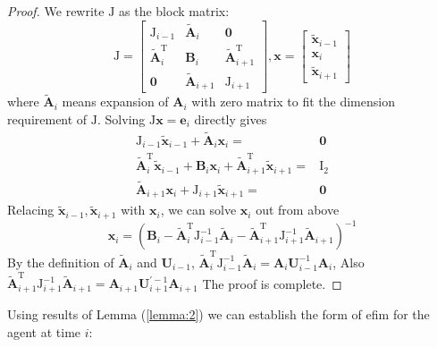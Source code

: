 \documentclass[conference]{IEEEtran}
\begin{document}
\begin{proof}
We rewrite $\bm{\mathrm{J}}$ as the block matrix:
\begin{equation}
\bm{\mathrm{J}}=\begin{bmatrix}
                 \bm{\mathrm{J}}_{i-1} & \bm{\tilde{A}}_i & \bm{0} \\
                 \bm{\tilde{A}}^{\mathrm{T}}_i & \bm{B}_i & \bm{\tilde{A}}^{\mathrm{T}}_{i+1} \\
                 \bm{0} & \bm{\tilde{A}}_{i+1} & \bm{\mathrm{J}}_{i+1}
               \end{bmatrix}, \bm{x}=\begin{bmatrix}
               \bm{\tilde{x}}_{i-1} \\
               \bm{x}_i \\
               \bm{\tilde{x}}_{i+1}   
               \end{bmatrix}            
\end{equation}
where $\tilde{\bm{A}}_i$ means expansion of $\bm{A}_i$ with zero matrix to fit the dimension requirement of $\bm{\mathrm{J}}$.
Solving $\bm{\mathrm{J}}\bm{x}=\bm{e}_i$ directly gives
\begin{align}
\bm{\mathrm{J}}_{i-1} \bm{\tilde{x}}_{i-1}+ \bm{\tilde{A}}_i \bm{x}_i =&\bm{0}\nonumber\\
\bm{\tilde{A}}_{i}^{\mathrm{T}}\bm{\tilde{x}}_{i-1}+ \bm{B}_i\bm{x}_i+\bm{\tilde{A}}_{i+1}^{\mathrm{T}}\bm{\tilde{x}}_{i+1}=&\bm{\mathrm{I}}_2 \nonumber\\
\bm{\tilde{A}}_{i+1} \bm{x}_{i} + \bm{\mathrm{J}}_{i+1} \bm{\tilde{x}}_{i+1}=&\bm{0}
\end{align}
Relacing $\bm{\tilde{x}}_{i-1},\bm{\tilde{x}}_{i+1}$ with $\bm{x}_i$, we can solve $\bm{x}_i$ out from above
\begin{equation}
\bm{x}_i=(\bm{B}_i-\bm{\tilde{A}}_{i}^{\mathrm{T}}\bm{\mathrm{J}}_{i-1} ^{-1}\bm{\tilde{A}}_{i}
-\bm{\tilde{A}}_{i+1}^{\mathrm{T}}\bm{\mathrm{J}}_{i+1} ^{-1}\bm{\tilde{A}}_{i+1}
)^{-1}
\end{equation}
By the definition of $\bm{\tilde{A}}_i$ and $\bm{U}_{i-1}$,
$\bm{\tilde{A}}_{i}^{\mathrm{T}}\bm{\mathrm{J}}_{i-1} ^{-1}\bm{\tilde{A}}_{i}=\bm{A}_i\bm{U}_{i-1}^{-1}\bm{A}_{i}$, Also
$\bm{\tilde{A}}_{i+1}^{\mathrm{T}}\bm{\mathrm{J}}_{i+1} ^{-1}\bm{\tilde{A}}_{i+1}=\bm{A}_{i+1}\bm{U}_{i+1}^{\prime-1}\bm{A}_{i+1}$
The proof is complete.
\end{proof}
Using results of Lemma (\ref{lemma:2}) we can establish the form of \ac{efim} for the agent at time $i$:
\end{document}
